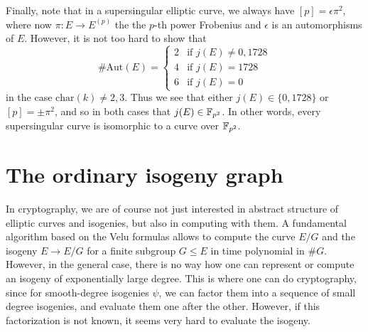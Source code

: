 Finally, note that in a supersingular elliptic curve, we always have $[p] = \epsilon \pi^2$, where now $\pi: E \to E^{(p)}$ the the $p$-th power Frobenius and $\epsilon$ is an automorphisms of $E$.
However, it is not too hard to show \cite[Thm~III.10.1]{arithmetic_elliptic_curves} that
\begin{equation*}
    \#\mathrm{Aut}(E) = \begin{cases}
        2 & \text{if $j(E) \neq 0, 1728$} \\
        4 & \text{if $j(E) = 1728$} \\
        6 & \text{if $j(E) = 0$}
    \end{cases}
\end{equation*}
in the case $\mathrm{char}(k) \neq 2, 3$.
Thus we see that either $j(E) \in \{ 0, 1728 \}$ or $[p] = \pm\pi^2$, and so in both cases that $j(E) \in \mathbb{F}_{p^2}$.
In other words, every supersingular curve is isomorphic to a curve over $\mathbb{F}_{p^2}$.

\section{The ordinary isogeny graph}

In cryptography, we are of course not just interested in abstract structure of elliptic curves and isogenies, but also in computing with them.
A fundamental algorithm based on the Velu formulas allows to compute the curve $E/G$ and the isogeny $E \to E/G$ for a finite subgroup $G \leq E$ in time polynomial in $\#G$.
However, in the general case, there is no way how one can represent or compute an isogeny of exponentially large degree.
This is where one can do cryptography, since for smooth-degree isogenies $\psi$, we can factor them into a sequence of small degree isogenies, and evaluate them one after the other.
However, if this factorization is not known, it seems very hard to evaluate the isogeny.

